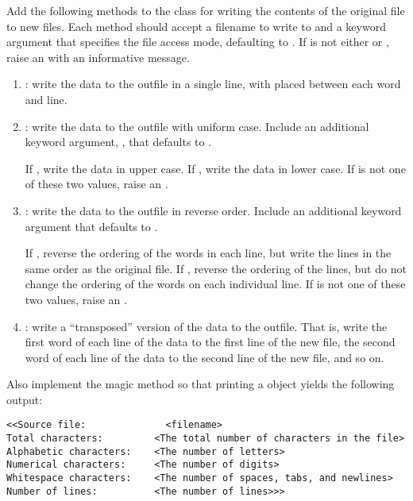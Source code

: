 \begin{problem}
Add the following methods to the  class for writing the contents of the original file to new files.
Each method should accept a filename to write to and a keyword argument  that specifies the file access mode, defaulting to .
If  is not either  or , raise an  with an informative message.

\begin{enumerate}

\item {}: write the data to the outfile in a single line, with  placed between each word and line.

\item {}: write the data to the outfile with uniform case. Include an additional keyword argument, , that defaults to .

If , write the data in upper case. If , write the data in lower case. If  is not one of these two values, raise an .

\item {}: write the data to the outfile in reverse order. Include an additional keyword argument  that defaults to .

If , reverse the ordering of the words in each line, but write the lines in the same order as the original file. If , reverse the ordering of the lines, but do not change the ordering of the words on each individual line. If  is not one of these two values, raise an .

\item {}: write a ``transposed'' version of the data to the outfile. That is, write the first word of each line of the data to the first line of the new file, the second word of each line of the data to the second line of the new file, and so on.
\end{enumerate}

Also implement the  magic method so that printing a  object yields the following output:
\begin{lstlisting}
<<Source file:              <filename>
Total characters:         <The total number of characters in the file>
Alphabetic characters:    <The number of letters>
Numerical characters:     <The number of digits>
Whitespace characters:    <The number of spaces, tabs, and newlines>
Number of lines:          <The number of lines>>>
\end{lstlisting}
\end{problem}

